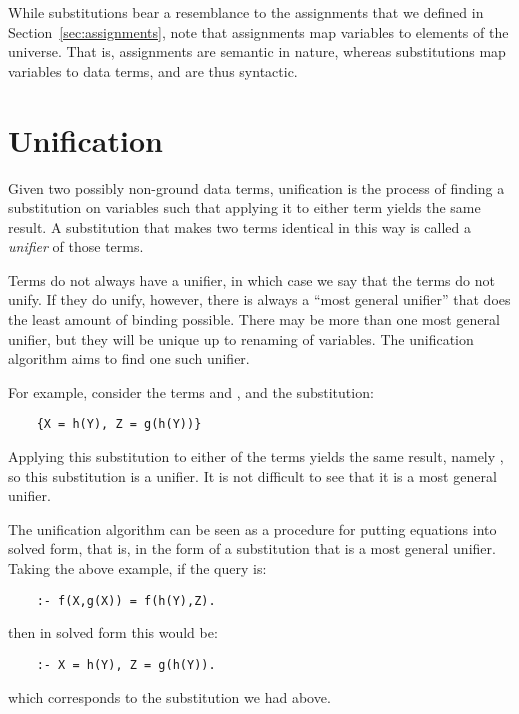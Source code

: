 While substitutions bear a resemblance to the assignments
that we defined in Section~\ref{sec:assignments},
note that assignments map variables to elements of the universe.
That is, assignments are semantic in nature,
whereas substitutions map variables to data terms,
and are thus syntactic.


\section{Unification}
\label{sec:unification}

Given two possibly non-ground data terms,
unification is the process of finding a substitution on variables
such that applying it to either term yields the same result.
A substitution that makes two terms identical in this way
is called a \emph{unifier} of those terms.

Terms do not always have a unifier,
in which case we say that the terms do not unify.
If they do unify, however,
there is always a ``most general unifier''
that does the least amount of binding possible.
There may be more than one most general unifier,
but they will be unique up to renaming of variables.
The unification algorithm aims to find one such unifier.

For example,
consider the terms  and ,
and the substitution:
\begin{verbatim}
    {X = h(Y), Z = g(h(Y))}
\end{verbatim}
Applying this substitution to either of the terms
yields the same result,
namely ,
so this substitution is a unifier.
It is not difficult to see that it is a most general unifier.

The unification algorithm can be seen as
a procedure for putting equations into solved form\label{gi:solved-form2},
that is, in the form of a substitution
that is a most general unifier.
Taking the above example, if the query is:
\begin{verbatim}
    :- f(X,g(X)) = f(h(Y),Z).
\end{verbatim}
then in solved form this would be:
\begin{verbatim}
    :- X = h(Y), Z = g(h(Y)).
\end{verbatim}
which corresponds to the substitution we had above.

